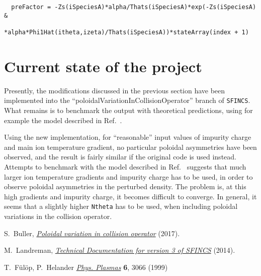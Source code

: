 \documentclass[12pt]{article}
\begin{document}
 \begin{lstlisting}
  preFactor = -Zs(iSpeciesA)*alpha/Thats(iSpeciesA)*exp(-Zs(iSpeciesA) &
            *alpha*Phi1Hat(itheta,izeta)/Thats(iSpeciesA))*stateArray(index + 1)
  \end{lstlisting}

\section*{Current state of the project}
Presently, the modifications discussed in the previous section have been implemented into the ``poloidalVariationInCollisionOperator'' branch of \texttt{SFINCS}. What remains is to benchmark the output with theoretical predictions, using for example the model described in Ref.~\cite{ref:Fulop}.

Using the new implementation, for ``reasonable'' input values of impurity charge and main ion temperature gradient, no particular poloidal asymmetries have been observed, and the result is fairly similar if the original code is used instead. Attempts to benchmark with the model described in Ref.~\cite{ref:Fulop} suggests that much larger ion temperature gradients and impurity charge has to be used, in order to observe poloidal asymmetries in the perturbed density. The problem is, at this high gradients and impurity charge, it becomes difficult to converge. In general, it seems that a slightly higher \texttt{Ntheta} has to be used, when including poloidal variations in the collision operator. 

\newpage

\begin{thebibliography}{99}

 S.~Buller, \href{https://github.com/landreman/sfincs/blob/poloidalVariationInCollisionOperator/doc/poloidal_variation_in_collision_operator_2017-09-08.pdf}{ \em Poloidal variation in collision operator} (2017).

 M.~Landreman, \href{https://github.com/landreman/sfincs/blob/poloidalVariationInCollisionOperator/doc/20150507-01\%20Technical\%20documentation\%20for\%20version\%203\%20of\%20SFINCS.pdf}{\em Technical Documentation for version 3 of SFINCS} (2014).

 T.~F\"{u}l\"{o}p, P.~Helander \href{http://aip.scitation.org/doi/abs/10.1063/1.873593}{\em Phys. Plasmas}{ \bf 6}, 3066 (1999) 
\end{thebibliography}
\end{document}
